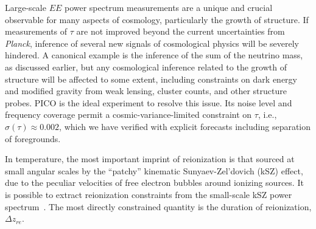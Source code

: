 \documentclass[PICOReport.tex]{subfiles}
\begin{document}
Large-scale $EE$ power spectrum measurements are a unique and crucial observable for many aspects of cosmology, particularly the growth of structure.  If measurements of $\tau$ are not improved beyond the current uncertainties from {\em Planck}, inference of several new signals of cosmological physics will be severely hindered.  A canonical example is the inference of the sum of the neutrino mass, as discussed earlier, but any cosmological inference related to the growth of structure will be affected to some extent, including constraints on dark energy and modified gravity from weak lensing, cluster counts, and other structure probes.  PICO is the ideal experiment to resolve this issue.  Its noise level and frequency coverage permit a cosmic-variance-limited constraint on $\tau$, i.e., $\sigma(\tau) \approx 0.002$, which we have verified with explicit forecasts including separation of foregrounds. 

In temperature, the most important imprint of reionization is that sourced at small angular scales by the ``patchy'' kinematic Sunyaev-Zel'dovich (kSZ) effect, due to the peculiar velocities of free electron bubbles around ionizing sources.  %
It is possible to extract reionization constraints from the small-scale kSZ power spectrum~\citep{calabrese/etal/2014}.  The most directly constrained quantity is the duration of reionization, $\Delta z_{re}$. %
\end{document}
